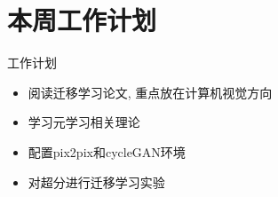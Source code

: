 \section{本周工作计划}

\begin{frame}{工作计划}
    \begin{itemize}
        \item 阅读迁移学习论文, 重点放在计算机视觉方向
        \item 学习元学习相关理论
        \item 配置pix2pix和cycleGAN环境
        \item 对超分进行迁移学习实验
    \end{itemize}
     
 \end{frame}
